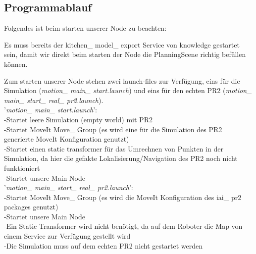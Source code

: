 \documentclass{suturo}
\begin{document}
\subsection{Programmablauf}

Folgendes ist beim starten unserer Node zu beachten:

Es muss bereits der kitchen\_ model\_ export Service von knowledge gestartet sein, damit wir direkt beim starten der Node die PlanningScene richtig befüllen können.

Zum starten unserer Node stehen zwei launch-files zur Verfügung, eins für die Simulation (\textit{motion\_ main\_ start.launch}) und eins für den echten PR2 (\textit{motion\_ main\_ start\_ real\_ pr2.launch}).
\\

'\textit{motion\_ main\_ start.launch}': \\
-Startet leere Simulation (empty world) mit PR2 \\
-Startet MoveIt Move\_ Group (es wird eine für die Simulation des PR2 generierte MoveIt Konfiguration genutzt)\\
-Startet einen static transformer für das Umrechnen von Punkten in der Simulation, da hier die gefakte Lokalisierung/Navigation des PR2 noch nicht funktioniert \\
-Startet unsere Main Node \\

\newpage
'\textit{motion\_ main\_ start\_ real\_ pr2.launch}': \\
-Startet MoveIt Move\_ Group (es wird die MoveIt Konfiguration des iai\_ pr2 packages genutzt) \\
-Startet unsere Main Node \\
-Ein Static Transformer wird nicht benötigt, da auf dem Roboter die Map von einem Service zur Verfügung gestellt wird \\
-Die Simulation muss auf dem echten PR2 nicht gestartet werden \\
\end{document}
